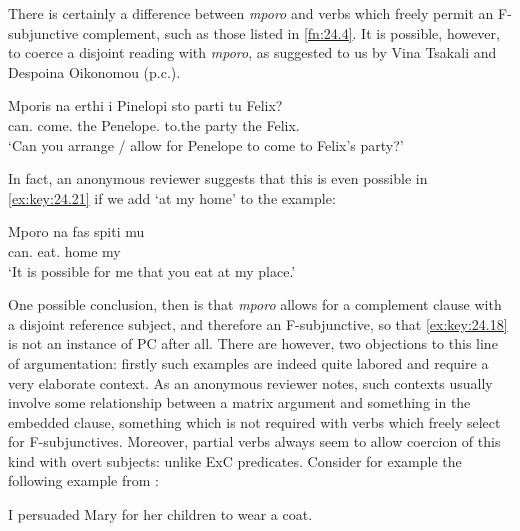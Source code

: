 \documentclass[output=paper]{langsci/langscibook}
\begin{document}
\ea%
    \label{ex:key:24.19} 
\z

There is certainly a difference between \emph{mporo} and verbs which freely
permit an F-subjunctive complement, such as those listed in \cref{fn:24.4}. It
is possible, however, to coerce a disjoint reading with \emph{mporo}, as
suggested to us by Vina Tsakali and Despoina Oikonomou (p.c.).

\ea%
    \label{ex:key:24.20}
    \sn
	\gll Mporis  na   erthi     i Pinelopi     sto   parti   tu  Felix?\\
		can.\Ssg{} \Sbjv{}   come.\Tsg{}   the Penelope.\Nom{}      to.the   party   the Felix.\Gen{}\\
	\glt ‘Can you arrange / allow for Penelope to come to Felix’s party?’
\z

In fact, an anonymous reviewer suggests that this is even possible in
\eqref{ex:key:24.21} if we add ‘at my home’ to the example:

\ea%
    \label{ex:key:24.21}
    \sn
	\gll Mporo   na   fas   spiti mu\\
    can.\Fsg{}   \Sbjv{}   eat.\Ssg{}  home my\\
	\glt ‘It is possible for me that you eat at my place.’
\z

One possible conclusion, then is that \emph{mporo} allows for a complement
clause with a disjoint reference subject, and therefore an F-subjunctive, so
that \eqref{ex:key:24.18} is not an instance of \gls{PC} after all.
There are however, two objections to this line of argumentation: firstly such
examples are indeed quite labored and require a very elaborate context. As an
anonymous reviewer notes, such contexts usually involve some relationship
between a matrix argument and something in the embedded clause, something which
is not required with verbs which freely select for F-subjunctives. Moreover,
partial  verbs always seem to allow coercion of this kind with overt
subjects: unlike \gls{ExC} predicates. Consider
for example the following example from :

\ea%
    \label{ex:key:24.22}
    I persuaded Mary for her children to wear a coat.
\z
\end{document}
